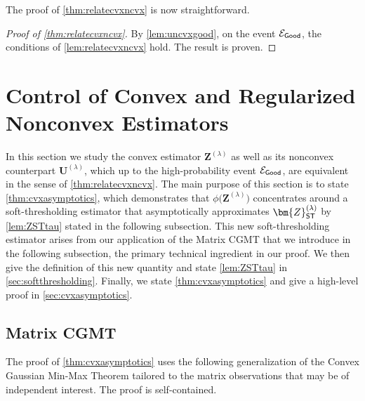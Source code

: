 \documentclass[10pt]{article}
\theoremstyle{definition}
\begin{document}
The proof of \cref{thm:relatecvxncvx} is now straightforward.
\begin{proof}[Proof of \cref{thm:relatecvxncvx}]
By \cref{lem:uncvxgood}, on the event $\mathcal{E}_{{\sf Good}}$, the conditions of \cref{lem:relatecvxncvx} hold.  The result is proven.
\end{proof}



\section{Control of Convex and Regularized Nonconvex Estimators} \label{sec:cvxcontrol}

In this section we study the convex estimator $\bm{Z}^{(\lambda)}$ as well as its nonconvex counterpart $\bm{U}^{(\lambda)}$, which up to the high-probability event $\mathcal{E}_{{\sf Good}}$, are equivalent in the sense of \cref{thm:relatecvxncvx}. 
The main purpose of this section is to state \cref{thm:cvxasymptotics}, which demonstrates that $\phi\big(\bm{Z}^{(\lambda)})$ concentrates around a  soft-thresholding estimator that asymptotically approximates $\bm{Z}_{{\sf ST}}^{(\lambda)}$ by \cref{lem:ZSTtau} stated in the following subsection.  This new soft-thresholding estimator arises from our application of the Matrix CGMT that we introduce in the following subsection, the primary technical ingredient in our proof.  We then give the definition of this new quantity and state \cref{lem:ZSTtau} in \cref{sec:softthresholding}.  Finally, we state \cref{thm:cvxasymptotics} and give a high-level proof in \cref{sec:cvxasymptotics}.




\subsection{Matrix CGMT} \label{sec:matrixcgmt}

The proof of \cref{thm:cvxasymptotics} uses the following generalization of the Convex Gaussian  Min-Max Theorem tailored to the matrix observations that may be of independent interest.   The proof is self-contained.   
\end{document}
